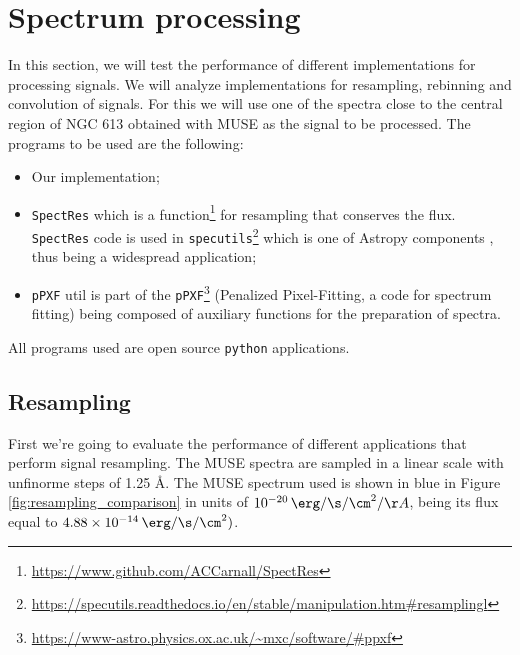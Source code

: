 \documentclass[12pt, letterpaper, twoside]{article}
\begin{document}
\section{Spectrum processing}
In this section, we will test the performance of different implementations for processing signals. We will analyze implementations for resampling, rebinning and convolution of signals.
For this we will use one of the spectra close to the central region of NGC 613 obtained with MUSE as the signal to be processed.
The programs to be used are the following:
\begin{itemize}
	\item Our implementation;
	\item \texttt{SpectRes} \citep{spectres+17} which is a function\footnote{\url{https://www.github.com/ACCarnall/SpectRes}} for resampling that conserves the flux. \texttt{SpectRes} code is used in \texttt{specutils}\footnote{\url{https://specutils.readthedocs.io/en/stable/manipulation.htm\#resamplingl}} which is one of Astropy components \citep{astropy+13, astropy+18}, thus being a widespread application;
	\item \texttt{pPXF} util \citep{cappellari+17, cappellari+03} is part of the \texttt{pPXF}\footnote{\url{https://www-astro.physics.ox.ac.uk/~mxc/software/\#ppxf}} (Penalized Pixel-Fitting, a code for spectrum fitting) being composed of auxiliary functions for the preparation of spectra.
\end{itemize}
All programs used are open source \texttt{python} applications.

\subsection{Resampling}
First we're going to evaluate the performance of different applications that perform signal resampling. The MUSE spectra are sampled in a linear scale with unfinorme steps of 1.25 \AA. The MUSE spectrum used is shown in blue in Figure \ref{fig:resampling_comparison} in units of $10^{-20} \, \erg/\s/\cm^{2}/\AA$, being its flux equal to $4.88 \times 10^{-14} \, \erg/\s/\cm^{2})$.
\end{document}
